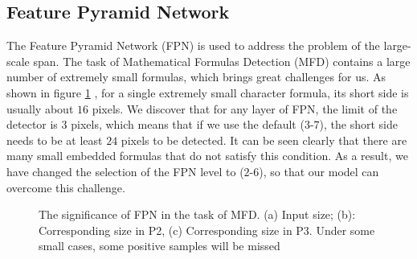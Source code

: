 \subsection{Feature Pyramid Network}
The Feature Pyramid Network (FPN) is used to address the problem of the large-scale span. The task of Mathematical Formulas Detection (MFD) contains a large number of extremely small formulas, which brings great challenges for us. As shown in figure \ref{fpn} \cite{1stprize}, for a single extremely small character formula, its short side is usually about $16$ pixels. We discover that for any layer of FPN, the limit of the detector is $3$ pixels, which means that if we use the default ($3$-$7$), the short side needs to be at least $24$ pixels to be detected. It can be seen clearly that there are many small embedded formulas that do not satisfy this condition. As a result, we have changed the selection of the FPN level to ($2$-$6$), so that our model can overcome this challenge.
\begin{figure}[H]
\caption{The significance of FPN in the task of MFD. (a) Input size; (b): Corresponding size in P2, (c) Corresponding size in P3. Under some small cases, some positive samples will be missed}
\label{fpn}
\end{figure}
